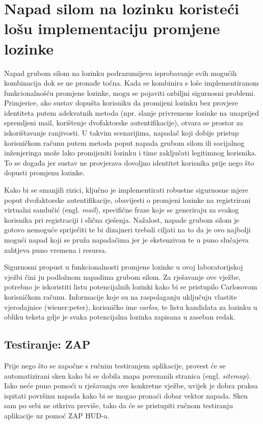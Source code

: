 \section{Napad silom na lozinku koristeći lošu implementaciju promjene lozinke}
Napad grubom silom na lozinku podrazumijeva isprobavanje svih mogućih kombinacija dok se ne pronađe točna. 
Kada se kombinira s loše implementiranom funkcionalnošću promjene lozinke, mogu se pojaviti ozbiljni sigurnosni problemi. 
Primjerice, ako sustav dopušta korisniku da promijeni lozinku bez provjere identiteta putem adekvatnih metoda (npr. slanje privremene lozinke na unaprijed spremljeni mail, korištenje dvofaktorske autentifikacije), otvara se prostor za iskorištavanje ranjivosti.
U takvim scenarijima, napadač koji dobije pristup korisničkom računu putem metoda poput napada grubom silom ili socijalnog inženjeringa može lako promijeniti lozinku i time zaključati legitimnog korisnika. 
To se događa jer sustav ne provjerava dovoljno identitet korisnika prije nego što dopusti promjenu lozinke.

Kako bi se smanjili rizici, ključno je implementirati robustne sigurnosne mjere poput dvofaktorske autentifikacije, obavijesti o promjeni lozinke na registrirani virtualni sandučić (engl. \textit{mail}), specifične fraze koje se generiraju za svakog korisnika pri registraciji i slična rješenja.
Nažalost, napade grubom silom je gotovo nemoguće spriječiti te bi dizajneri trebali ciljati na to da je ovo najbolji mogući napad koji se pruža napadačima jer je ekstenzivan te u puno slučajeva zahtjeva puno vremena i resursa.\cite{knudsen2011brute} 

Sigurnosni propust u funkcionalnosti promjene lozinke u ovoj laboratorijskoj vježbi čini ju podložnom napadima grubom silom. Za rješavanje ove vježbe, potrebno je iskoristiti listu potencijalnih lozinki kako bi se pristupilo Carlosovom korisničkom računu. 
Informacije koje su na raspolaganju uključuju vlastite vjerodajnice (wiener:peter), korisničko ime \textit{carlos}, te listu kandidata za lozinku u obliku teksta gdje je svaka potencijalna lozinka zapisana u zaseban redak.\cite{brute_lab}
\newpage %
\subsection{Testiranje: ZAP}
Prije nego što se započne s ručnim testiranjem aplikacije, provest će se automatizirani sken kako bi se dobila mapa povezanih stranica (engl. \textit{sitemap}). 
Iako neće puno pomoći u rješavanju ove konkretne vježbe, uvijek je dobra praksa ispitati površinu napada kako bi se mogao pronaći dobar vektor napada. 
Sken sam po sebi ne otkriva previše, tako da će se pristupiti ručnom testiranju aplikacije uz pomoć ZAP HUD-a.

